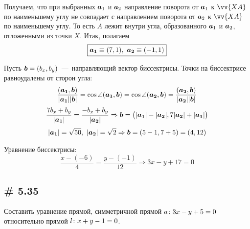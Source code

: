\documentclass[a4paper,12pt]{article}
\begin{document}
\begin{solution}
    Получаем, что при выбранных $\boldsymbol a_1$ и $\boldsymbol a_2$ направление поворота от $\boldsymbol a_1$ к $\vv{XA}$ по наименьшему углу не совпадает с направлением поворота от $\boldsymbol a_2$ к $\vv{XA}$ по наименьшему углу.
    То есть $A$ лежит внутри угла, образованного $\boldsymbol a_1$ и $\boldsymbol a_2$, отложенными из точки $X$.
    Итак, полагаем
    \[
      \boxed{\boldsymbol{a_1} \equiv (7, 1),\ \boldsymbol{a_2} \equiv (-1, 1)}
    \]

    Пусть $\bds b \hm= (b_x, b_y)$~---~направляющий вектор биссектрисы. Точки на биссектрисе равноудалены от сторон угла:
    \[
      \frac{(\boldsymbol{a_1}, \boldsymbol b)}{|\boldsymbol{a_1}||\boldsymbol b|} = \cos \angle (\boldsymbol{a_1}, \boldsymbol b)
      = \cos \angle (\boldsymbol{a_2}, \boldsymbol b)
      = \frac{(\boldsymbol{a_2}, \boldsymbol b)}{|\boldsymbol{a_2}||\boldsymbol b|}
    \]
    \[
      \frac{7 b_x + b_y}{|\boldsymbol{a_1}|} = \frac{-b_x + b_y}{|\boldsymbol{a_2}|}
      \Rightarrow
      \boldsymbol b = \bigl(|\boldsymbol{a_1}| - |\boldsymbol{a_2}|, 7|\boldsymbol{a_2}| + |\boldsymbol{a_1}|\bigr)
    \]
    \[
      |\boldsymbol{a_1}| = \sqrt{50},\ |\boldsymbol{a_2}| = \sqrt{2} \Rightarrow \boldsymbol b = (5 - 1, 7 + 5) = (4, 12)
    \]

    Уравнение биссектрисы:
    \[
      \frac{x - (-6)}{4} = \frac{y - (-1)}{12}
      \Rightarrow \boxed{3x - y + 17 = 0}
    \]
  \end{solution}
  
  
  \subsection{\# 5.35}
  
  \begin{problem}
    Составить уравнение прямой, симметричной прямой $a\colon 3x \hm- y \hm+ 5 \hm= 0$ относительно прямой $l\colon x \hm+ y \hm- 1 \hm= 0$.
  \end{problem}
  
\end{document}
